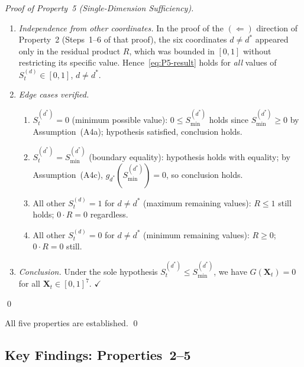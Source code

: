 \documentclass[12pt,openany]{book}
\numberwithin{equation}{chapter}
\theoremstyle{plain}
\theoremstyle{definition}
\theoremstyle{remark}
\def\mathcal#1{#1}%
\begin{document}
\begin{proof}[Proof of Property~5 (Single-Dimension Sufficiency)]
\begin{enumerate}
  \item \emph{Independence from other coordinates.}
        In the proof of the $(\Leftarrow)$ direction of
        Property~2 (Steps~1--6 of that proof), the six
        coordinates $d\neq d^*$ appeared only in the
        residual product $R$, which was bounded in $[0,1]$
        without restricting its specific value.
        Hence~\eqref{eq:P5-result} holds for
        \emph{all} values of
        $\mathcal{S}_t^{(d)}\in[0,1]$, $d\neq d^*$.

  \item \emph{Edge cases verified.}
        \begin{enumerate}
          \item $\mathcal{S}_t^{(d^*)}=0$
                (minimum possible value):
                $0\leq\mathcal{S}_{\min}^{(d^*)}$ holds
                since $\mathcal{S}_{\min}^{(d^*)}\geq 0$
                by Assumption~(A4a);
                hypothesis satisfied, conclusion holds.
          \item $\mathcal{S}_t^{(d^*)}=
                \mathcal{S}_{\min}^{(d^*)}$
                (boundary equality):
                hypothesis holds with equality;
                by Assumption~(A4c),
                $g_{d^*}\!\left(\mathcal{S}_{\min}^{(d^*)}\right)=0$,
                so conclusion holds.
          \item All other $\mathcal{S}_t^{(d)}=1$ for
                $d\neq d^*$ (maximum remaining values):
                $R\leq 1$ still holds; $0\cdot R=0$
                regardless.
          \item All other $\mathcal{S}_t^{(d)}=0$ for
                $d\neq d^*$ (minimum remaining values):
                $R\geq 0$; $0\cdot R=0$ still.
        \end{enumerate}

  \item \emph{Conclusion.}
        Under the sole hypothesis
        $\mathcal{S}_t^{(d^*)}\leq\mathcal{S}_{\min}^{(d^*)}$,
        we have $G(\mathbf{X}_t)=0$ for all
        $\mathbf{X}_t\in[0,1]^7$.
        \hfill$\checkmark$
\end{enumerate}
\qed
\end{proof}

\noindent
All five properties are established. \qed

\subsection*{Key Findings: Properties~2--5}
\end{document}
